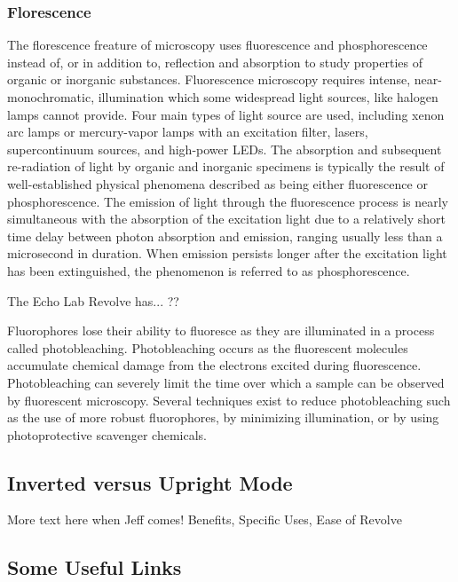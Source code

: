 \documentclass{article}
\begin{document}
\subsubsection{Florescence}

The florescence freature of microscopy uses fluorescence and phosphorescence instead of, or in addition to, reflection and absorption to study properties of organic or inorganic substances. Fluorescence microscopy requires intense, near-monochromatic, illumination which some widespread light sources, like halogen lamps cannot provide. Four main types of light source are used, including xenon arc lamps or mercury-vapor lamps with an excitation filter, lasers, supercontinuum sources, and high-power LEDs. 
The absorption and subsequent re-radiation of light by organic and inorganic specimens is typically the result of well-established physical phenomena described as being either fluorescence or phosphorescence. The emission of light through the fluorescence process is nearly simultaneous with the absorption of the excitation light due to a relatively short time delay between photon absorption and emission, ranging usually less than a microsecond in duration. When emission persists longer after the excitation light has been extinguished, the phenomenon is referred to as phosphorescence.

The Echo Lab Revolve has... ??

Fluorophores lose their ability to fluoresce as they are illuminated in a process called photobleaching. Photobleaching occurs as the fluorescent molecules accumulate chemical damage from the electrons excited during fluorescence. Photobleaching can severely limit the time over which a sample can be observed by fluorescent microscopy. Several techniques exist to reduce photobleaching such as the use of more robust fluorophores, by minimizing illumination, or by using photoprotective scavenger chemicals.

\subsection{Inverted versus Upright Mode}

More text here when Jeff comes!
Benefits, Specific Uses, Ease of Revolve

\subsection{Some Useful Links}

\end{document}
